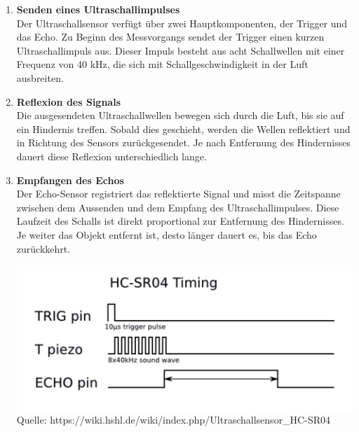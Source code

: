 \documentclass[ngerman,12pt,a4paper]{article}
\begin{document}
		\begin{enumerate}
		\item \textbf{Senden eines Ultraschallimpulses} \\
		Der Ultraschallsensor verfügt über zwei Hauptkomponenten, der Trigger und das Echo. 
		Zu Beginn des Messvorgangs sendet der Trigger einen kurzen Ultraschallimpuls aus. 
		Dieser Impuls besteht aus acht Schallwellen mit einer Frequenz von 40 kHz, die sich mit Schallgeschwindigkeit in der Luft ausbreiten.
		
		\item \textbf{Reflexion des Signals} \\
		Die ausgesendeten Ultraschallwellen bewegen sich durch die Luft, bis sie auf ein Hindernis treffen. Sobald dies geschieht, werden die Wellen reflektiert und in Richtung des Sensors zurückgesendet. Je nach Entfernung des Hindernisses dauert diese Reflexion unterschiedlich lange.
		
		\item \textbf{Empfangen des Echos} \\
		Der Echo-Sensor registriert das reflektierte Signal und misst die Zeitspanne zwischen dem Aussenden und dem Empfang des Ultraschallimpulses. Diese Laufzeit des Schalls ist direkt proportional zur Entfernung des Hindernisses. Je weiter das Objekt entfernt ist, desto länger dauert es, bis das Echo zurückkehrt.\\
		
		\begin{center}
			\begin{minipage}{0.7\textwidth}
				\centering
				\includegraphics[width=\textwidth]{Pictures/hcsr04_timing}
				\label{fig:hcsr04_timing}
				\vspace{5pt}
				{\small Quelle: {https://wiki.hshl.de/wiki/index.php/Ultraschallsensor\_HC-SR04}}
			\end{minipage}
		\end{center}
		

\end{enumerate}
\end{document}
